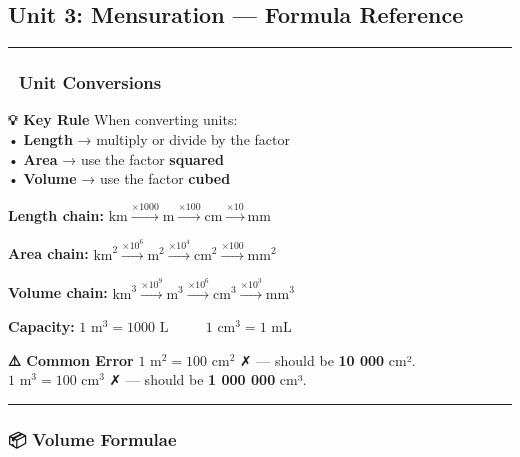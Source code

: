 \documentclass[
  letterpaper,
  DIV=11,
  numbers=noendperiod]{scrreprt}
\theoremstyle{definition}
\theoremstyle{remark}
\begin{document}
\subsection*{Unit 3: Mensuration --- Formula
Reference}\label{unit-3-mensuration-formula-reference}

\begin{center}\rule{0.5\linewidth}{0.5pt}\end{center}

\subsubsection*{📏 Unit Conversions}\label{unit-conversions}

\textbf{💡 Key Rule} When converting units:\\
• \textbf{Length} → multiply or divide by the factor\\
• \textbf{Area} → use the factor \textbf{squared}\\
• \textbf{Volume} → use the factor \textbf{cubed}

\textbf{Length chain:}
\(\text{km} \xrightarrow{\times 1000} \text{m} \xrightarrow{\times 100} \text{cm} \xrightarrow{\times 10} \text{mm}\)

\textbf{Area chain:}
\(\text{km}^2 \xrightarrow{\times 10^6} \text{m}^2 \xrightarrow{\times 10^4} \text{cm}^2 \xrightarrow{\times 100} \text{mm}^2\)

\textbf{Volume chain:}
\(\text{km}^3 \xrightarrow{\times 10^9} \text{m}^3 \xrightarrow{\times 10^6} \text{cm}^3 \xrightarrow{\times 10^3} \text{mm}^3\)

\textbf{Capacity:} \(1\text{ m}^3 = 1000\text{ L}\) \(\qquad\)
\(1\text{ cm}^3 = 1\text{ mL}\)

\textbf{⚠️ Common Error} \(1\text{ m}^2 = 100\text{ cm}^2\) ✗ --- should
be \textbf{10 000} cm².\\
\(1\text{ m}^3 = 100\text{ cm}^3\) ✗ --- should be \textbf{1 000 000}
cm³.

\begin{center}\rule{0.5\linewidth}{0.5pt}\end{center}

\subsubsection*{📦 Volume Formulae}\label{volume-formulae}
\end{document}
